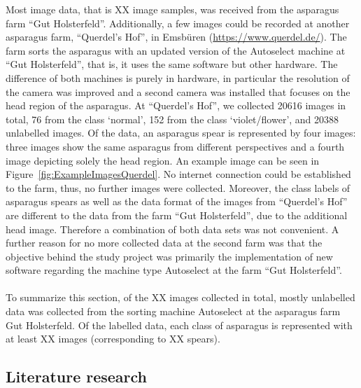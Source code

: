 Most image data, that is XX image samples, was received from the asparagus farm “Gut Holsterfeld”. Additionally, a few images could be recorded at another asparagus farm, “Querdel’s Hof”, in Emsbüren (\url{https://www.querdel.de/}). The farm sorts the asparagus with an updated version of the Autoselect machine at “Gut Holsterfeld”, that is, it uses the same software but other hardware. The difference of both machines is purely in hardware, in particular the resolution of the camera was improved and a second camera was installed that focuses on the head region of the asparagus. At “Querdel’s Hof”, we collected 20616 images in total, 76 from the class ‘normal’, 152 from the class ‘violet/flower’, and 20388 unlabelled images. Of the data, an asparagus spear is represented by four images: three images show the same asparagus from different perspectives and a fourth image depicting solely the head region. An example image can be seen in Figure~\ref{fig:ExampleImagesQuerdel}. No internet connection could be established to the farm, thus, no further images were collected. Moreover, the class labels of asparagus spears as well as the data format of the images from “Querdel’s Hof” are different to the data from the farm “Gut Holsterfeld”, due to the additional head image. Therefore a combination of both data sets was not convenient. A further reason for no more collected data at the second farm was that the objective behind the study project was primarily the implementation of new software regarding the machine type Autoselect at the farm “Gut Holsterfeld”. \\
\\
To summarize this section, of the XX images collected in total, mostly unlabelled data was collected from the sorting machine Autoselect at the asparagus farm Gut Holsterfeld. Of the labelled data, each class of asparagus is represented with at least XX images (corresponding to XX spears).


\subsection{Literature research}

